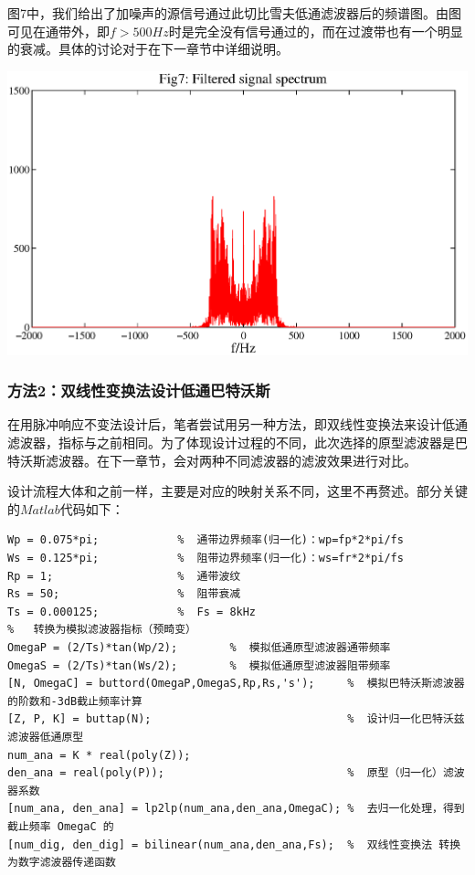 \documentclass[a4paper,11pt,onecolumn,twoside]{article}
\begin{document}
图7中，我们给出了加噪声的源信号通过此切比雪夫低通滤波器后的频谱图。由图可见在通带外，即$f>500Hz$时是完全没有信号通过的，而在过渡带也有一个明显的衰减。具体的讨论对于在下一章节中详细说明。
\begin{center}
    \includegraphics[width=1\textwidth]{fig7.eps}
\end{center}

\subsubsection{方法2：双线性变换法设计低通巴特沃斯}
在用脉冲响应不变法设计后，笔者尝试用另一种方法，即双线性变换法来设计低通滤波器，指标与之前相同。为了体现设计过程的不同，此次选择的原型滤波器是巴特沃斯滤波器。在下一章节，会对两种不同滤波器的滤波效果进行对比。

设计流程大体和之前一样，主要是对应的映射关系不同，这里不再赘述。部分关键的$Matlab$代码如下：

\begin{lstlisting}[style=Matlab-editor,
                   basicstyle=\mlttfamily,
                   caption={Designing IIR Filter Code}, label=code2]
Wp = 0.075*pi;            %  通带边界频率(归一化)：wp=fp*2*pi/fs
Ws = 0.125*pi;            %  阻带边界频率(归一化)：ws=fr*2*pi/fs
Rp = 1;                   %  通带波纹
Rs = 50;                  %  阻带衰减
Ts = 0.000125;            %  Fs = 8kHz
%   转换为模拟滤波器指标（预畸变）
OmegaP = (2/Ts)*tan(Wp/2);        %  模拟低通原型滤波器通带频率
OmegaS = (2/Ts)*tan(Ws/2);        %  模拟低通原型滤波器阻带频率
[N, OmegaC] = buttord(OmegaP,OmegaS,Rp,Rs,'s');     %  模拟巴特沃斯滤波器的阶数和-3dB截止频率计算
[Z, P, K] = buttap(N);                              %  设计归一化巴特沃兹滤波器低通原型
num_ana = K * real(poly(Z));
den_ana = real(poly(P));                            %  原型（归一化）滤波器系数
[num_ana, den_ana] = lp2lp(num_ana,den_ana,OmegaC); %  去归一化处理，得到截止频率 OmegaC 的
[num_dig, den_dig] = bilinear(num_ana,den_ana,Fs);  %  双线性变换法 转换为数字滤波器传递函数
\end{lstlisting}
\end{document}
